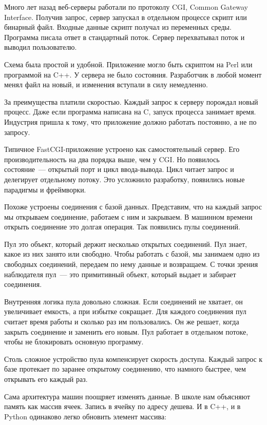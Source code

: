Много лет назад веб-серверы работали по протоколу CGI, Common Gateway
Interface. Получив
запрос, сервер запускал в отдельном процессе скрипт или бинарный файл. Входные
данные скрипт получал из переменных среды. Программа писала ответ в стандартный
поток. Сервер перехватывал поток и выводил пользователю.

Схема была простой и удобной. Приложение могло быть скриптом на Perl или
программой на C++. У сервера не было состояния. Разработчик в любой момент менял
файл на новый, и изменения вступали в силу немедленно.

За преимущества платили скоростью. Каждый запрос к серверу порождал новый
процесс. Даже если программа написана на C, запуск процесса занимает
время. Индустрия пришла к тому, что приложение должно работать постоянно, а не
по запросу.

Типичное FastCGI-приложение устроено как самостоятельный сервер. Его
производительность на два порядка выше, чем у CGI. Но появилось состояние~---
открытый порт и цикл ввода-вывода. Цикл читает запрос и делегирует отдельному
потоку. Это усложнило разработку, появились новые парадигмы и фреймворки.

Похоже устроены соединения с базой данных. Представим, что на каждый запрос мы
открываем соединение, работаем с ним и закрываем. В машинном времени открыть
соединение это долгая операция. Так появились пулы соединений.

Пул это объект, который держит несколько открытых соединений. Пул знает, какое
из них занято или свободно. Чтобы работать с базой, мы занимаем одно из
свободных соединений, передаем по нему данные и возвращаем. С точки зрения
наблюдателя пул~--- это примитивный объект, который выдает и забирает
соединения.

Внутренняя логика пула довольно сложная. Если соединений не хватает, он
увеличивает емкость, а при избытке сокращает. Для каждого соединения пул считает
время работы и сколько раз им пользовались. Он же решает, когда закрыть
соединение и заменить его новым. Пул работает в отдельном потоке, чтобы не
блокировать основную программу.

Столь сложное устройство пула компенсирует скорость доступа. Каждый запрос к
базе протекает по заранее открытому соединению, что намного быстрее, чем
открывать его каждый раз.

Сама архитектура машин поощряет изменять данные. В школе нам объясняют память
как массив ячеек. Запись в ячейку по адресу дешева. И в C++, и в Python
одинаково легко обновить элемент массива:

